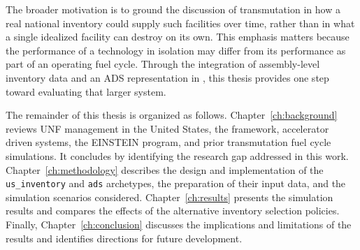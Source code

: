 The broader motivation is to ground the discussion of transmutation in how a
real national inventory could supply such facilities over time, rather than in
what a single idealized facility can destroy on its own. This emphasis matters
because the performance of a technology in isolation may differ from its
performance as part of an operating fuel cycle. Through the integration of
assembly-level inventory data and an \gls{ADS} representation in \Cyclus, this
thesis provides one step toward evaluating that larger system.

The remainder of this thesis is organized as follows.
Chapter~\ref{ch:background} reviews \gls{UNF} management in the
United States, the \Cyclus framework, accelerator driven systems, the
\gls{EINSTEIN} program, and prior transmutation fuel cycle simulations. It concludes
by identifying the research gap addressed in this work.
Chapter~\ref{ch:methodology} describes the design and implementation of the
\texttt{us\_inventory} and \texttt{ads} archetypes, the preparation of their
input data, and the simulation scenarios considered.
Chapter~\ref{ch:results} presents the simulation results and compares the
effects of the alternative inventory selection policies.
Finally, Chapter~\ref{ch:conclusion} discusses the implications and
limitations of the results and identifies directions for future development.